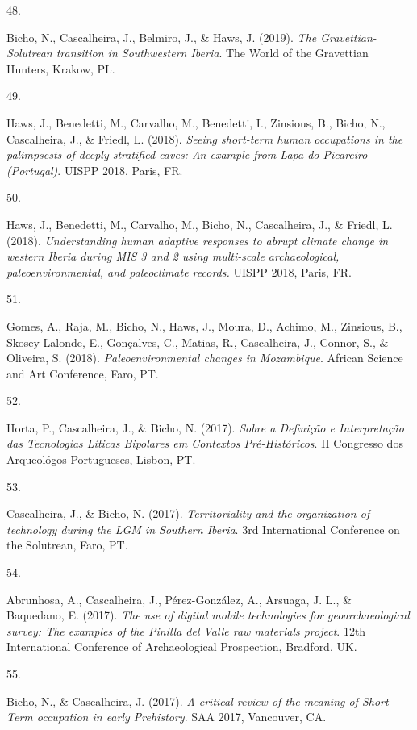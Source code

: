 \documentclass[11pt,a4paper,]{awesome-cv}
\newlength{\cslhangindent}
\newlength{\csllabelwidth}
\newenvironment{CSLReferences}[2] %
 {\begin{list}{}{%
  \setlength{\itemindent}{0pt}
  \setlength{\leftmargin}{0pt}
  \setlength{\parsep}{0pt}
  \ifodd #1
   \setlength{\leftmargin}{\cslhangindent}
   \setlength{\itemindent}{-1\cslhangindent}
  \fi
  \setlength{\itemsep}{#2\baselineskip}}}
 {\end{list}}
\newcommand{\CSLLeftMargin}[1]{\parbox[t]{\csllabelwidth}{\strut#1\strut}}
\newcommand{\CSLRightInline}[1]{\parbox[t]{\linewidth - \csllabelwidth}{\strut#1\strut}}
\begin{document}
\begin{CSLReferences}{0}{0}
\CSLLeftMargin{48. }%
\CSLRightInline{Bicho, N., Cascalheira, J., Belmiro, J., \& Haws, J.
(2019). \emph{The Gravettian-Solutrean transition in Southwestern
Iberia}. The World of the Gravettian Hunters, Krakow, PL.}

\CSLLeftMargin{49. }%
\CSLRightInline{Haws, J., Benedetti, M., Carvalho, M., Benedetti, I.,
Zinsious, B., Bicho, N., Cascalheira, J., \& Friedl, L. (2018).
\emph{Seeing short-term human occupations in the palimpsests of deeply
stratified caves: An example from Lapa do Picareiro (Portugal)}. UISPP
2018, Paris, FR.}

\CSLLeftMargin{50. }%
\CSLRightInline{Haws, J., Benedetti, M., Carvalho, M., Bicho, N.,
Cascalheira, J., \& Friedl, L. (2018). \emph{Understanding human
adaptive responses to abrupt climate change in western Iberia during MIS
3 and 2 using multi-scale archaeological, paleoenvironmental, and
paleoclimate records.} UISPP 2018, Paris, FR.}

\CSLLeftMargin{51. }%
\CSLRightInline{Gomes, A., Raja, M., Bicho, N., Haws, J., Moura, D.,
Achimo, M., Zinsious, B., Skosey-Lalonde, E., Gonçalves, C., Matias, R.,
Cascalheira, J., Connor, S., \& Oliveira, S. (2018).
\emph{Paleoenvironmental changes in Mozambique}. African Science and Art
Conference, Faro, PT.}

\CSLLeftMargin{52. }%
\CSLRightInline{Horta, P., Cascalheira, J., \& Bicho, N. (2017).
\emph{Sobre a Definição e Interpretação das Tecnologias Líticas
Bipolares em Contextos Pré-Históricos}. II Congresso dos Arqueológos
Portugueses, Lisbon, PT.}

\CSLLeftMargin{53. }%
\CSLRightInline{Cascalheira, J., \& Bicho, N. (2017).
\emph{Territoriality and the organization of technology during the LGM
in Southern Iberia}. 3rd International Conference on the Solutrean,
Faro, PT.}

\CSLLeftMargin{54. }%
\CSLRightInline{Abrunhosa, A., Cascalheira, J., Pérez-González, A.,
Arsuaga, J. L., \& Baquedano, E. (2017). \emph{The use of digital mobile
technologies for geoarchaeological survey: The examples of the Pinilla
del Valle raw materials project}. 12th International Conference of
Archaeological Prospection, Bradford, UK.}

\CSLLeftMargin{55. }%
\CSLRightInline{Bicho, N., \& Cascalheira, J. (2017). \emph{A critical
review of the meaning of Short-Term occupation in early Prehistory}. SAA
2017, Vancouver, CA.}


\end{CSLReferences}
\end{document}
